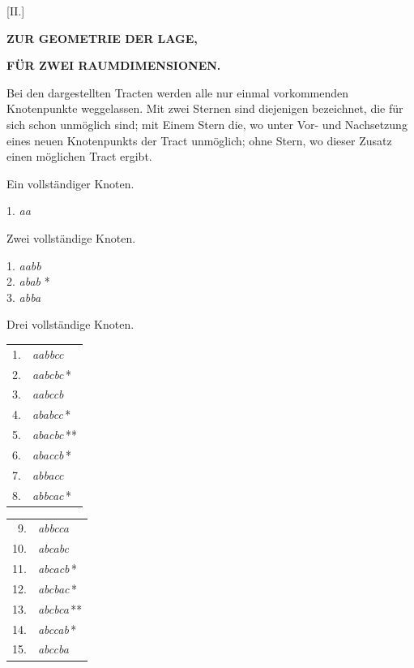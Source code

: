 \clearpage{}
\begin{center}
[II.]
\end{center}

\begin{center}\textbf{ZUR GEOMETRIE DER LAGE,}\par\medskip\textbf{FÜR ZWEI RAUMDIMENSIONEN.}\end{center}

Bei den dargestellten Tracten werden alle nur einmal vorkommenden Knotenpunkte weggelassen. Mit zwei Sternen sind diejenigen bezeichnet, die für sich schon unmöglich sind; mit Einem Stern die, wo unter Vor- und Nachsetzung eines neuen Knotenpunkts der Tract unmöglich; ohne Stern, wo dieser Zusatz einen möglichen Tract ergibt.

\begin{center}
Ein vollständiger Knoten.

1. \emph{aa}
\end{center}

\begin{center}
Zwei vollständige Knoten.

1. \emph{aabb}\\
2. \emph{abab} *\\
3. \emph{abba}
\end{center}

\begin{center}
Drei vollständige Knoten.
\end{center}
\begin{center}
\begin{minipage}[t]{.30\linewidth}\centering\begin{tabular}[t]{rl}
1. & \emph{aabbcc} \\
2. & \emph{aabcbc}\,* \\
3. & \emph{aabccb} \\
4. & \emph{ababcc}\,* \\
5. & \emph{abacbc}\,** \\
6. & \emph{abaccb}\,* \\
7. & \emph{abbacc} \\
8. & \emph{abbcac}\,* \\
\end{tabular}\end{minipage}\hspace{1em}\begin{minipage}[t]{.30\linewidth}\centering\begin{tabular}[t]{rl}
9. & \emph{abbcca} \\
10. & \emph{abcabc} \\
11. & \emph{abcacb}\,* \\
12. & \emph{abcbac}\,* \\
13. & \emph{abcbca}\,** \\
14. & \emph{abccab}\,* \\
15. & \emph{abccba} \\
\end{tabular}\end{minipage}
\end{center}
